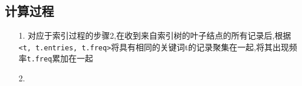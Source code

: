 \documentclass{elegantpaper}
\begin{document}
\subsection{计算过程}
\begin{itemize}
    \item[1.] 对应于索引过程的步骤2,在收到来自索引树的叶子结点的所有记录后,根据\verb|<t, t.entries, t.freq>|将具有相同的关键词t的记录聚集在一起,将其出现频率\verb|t.freq|累加在一起
    \item[2.] 
\end{itemize}
\end{document}
